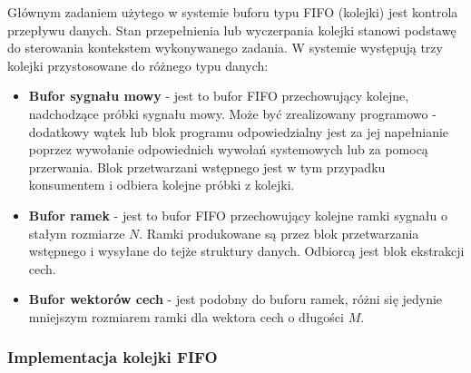 Głównym zadaniem użytego w systemie buforu typu FIFO (kolejki) jest kontrola przepływu danych. Stan przepełnienia lub wyczerpania kolejki stanowi podstawę do sterowania kontekstem wykonywanego zadania. W systemie występują trzy kolejki przystosowane do różnego typu danych:
\begin{itemize}
\item{\textbf{Bufor sygnału mowy}} - jest to bufor FIFO przechowujący kolejne, nadchodzące próbki sygnału mowy. Może być zrealizowany programowo - dodatkowy wątek lub blok programu odpowiedzialny jest za jej napełnianie poprzez wywołanie odpowiednich wywołań systemowych lub za pomocą przerwania. Blok przetwarzani wstępnego jest w tym przypadku konsumentem i odbiera kolejne próbki z kolejki.
\item{\textbf{Bufor ramek}} - jest to bufor FIFO przechowujący kolejne ramki sygnału o stałym rozmiarze $N$. Ramki produkowane są przez blok przetwarzania wstępnego i wysyłane do tejże struktury danych. Odbiorcą jest blok ekstrakcji cech.
\item{\textbf{Bufor wektorów cech}} - jest podobny do buforu ramek, różni się jedynie mniejszym rozmiarem ramki dla wektora cech o długości $M$. 
\end{itemize}

\subsubsection{Implementacja kolejki FIFO}

